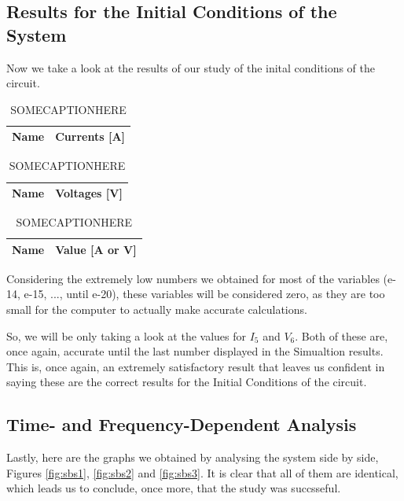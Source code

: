 \clearpage
\subsection{Results for the Initial Conditions of the System}

Now we take a look at the results of our study of the inital conditions of the circuit.

\begin{table}[htb!]
  \begin{tabular}{|l|r|}
    \hline    
    {\bf Name} & {\bf Currents [A]} \\ \hline
    
  \end{tabular}
\quad
  \begin{tabular}{|l|r|}
    \hline    
    {\bf Name} & {\bf Voltages [V]} \\ \hline
    
  \end{tabular}
\quad
  \begin{tabular}{|l|r|}
    \hline    
    {\bf Name} & {\bf Value [A or V]} \\ \hline
    
  \end{tabular}
  \caption{SOMECAPTIONHERE}
\end{table}


Considering the extremely low numbers we obtained for most of the variables (e-14, e-15, ..., until e-20), these variables will be considered zero, as they are too small for the computer to actually make accurate calculations.

So, we will be only taking a look at the values for $I_5$ and $V_6$. Both of these are, once again, accurate until the last number displayed in the Simualtion results. This is, once again, an extremely satisfactory result that leaves us confident in saying these are the correct results for the Initial Conditions of the circuit.

\clearpage
\subsection{Time- and Frequency-Dependent Analysis}

Lastly, here are the graphs we obtained by analysing the system side by side, Figures \ref{fig:sbs1}, \ref{fig:sbs2} and \ref{fig:sbs3}. It is clear that all of them are identical, which leads us to conclude, once more, that the study was succsseful.

